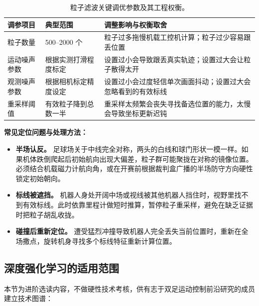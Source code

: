 \begin{table}[H]
\centering
\small
\begin{tabularx}{\textwidth}{p{2.6cm} p{3.2cm} X}
\toprule
\textbf{调参项目} & \textbf{典型范围} & \textbf{调整影响与权衡取舍} \\
\midrule
粒子数量 & 500--2000 个 & 粒子过多拖慢机载工控机计算；粒子过少容易跟丢位置 \\
\addlinespace
运动噪声参数 & 根据实测打滑程度标定 & 设置过小会导致跟丢真实轨迹；设置过大会让粒子散得太开 \\
\addlinespace
观测噪声参数 & 根据相机标定精度设定 & 设置过小会过度轻信单次画面抖动；设置过大会忽略看到的有效标线 \\
\addlinespace
重采样阈值 & 有效粒子降到总数一半 & 重采样太频繁会丧失寻找备选位置的能力，太慢会导致坐标更新迟钝 \\
\bottomrule
\end{tabularx}
\caption{粒子滤波关键调优参数及其工程权衡。}
\end{table}

\noindent\textbf{常见定位问题与处理方法：}
\begin{itemize}[leftmargin=*]
    \item \textbf{半场认反。} 足球场关于中线完全对称，两头的白线和球门形状一模一样。如果机体跌倒爬起后初始航向出现大偏差，粒子群可能聚拢在对称的镜像位置。必须结合机载磁力计航向角，或在开赛前根据裁判盒广播的半场防守方向硬性锁定初始朝向。
    \item \textbf{标线被遮挡。} 机器人身处开阔中场或视线被其他机器人挡住时，视野里找不到有效标线。此时依靠里程计做短时推算，暂停粒子重采样，避免在缺乏证据时把粒子胡乱收拢。
    \item \textbf{碰撞后重新定位。} 遭受猛烈冲撞导致机器人完全丢失当前位置时，重新在全场撒点，旋转机身寻找多个标线特征重新计算位置。
\end{itemize}

\subsection{深度强化学习的适用范围}

本节为进阶选读内容，不做硬性技术考核，供有志于双足运动控制前沿研究的成员建立技术图谱：

